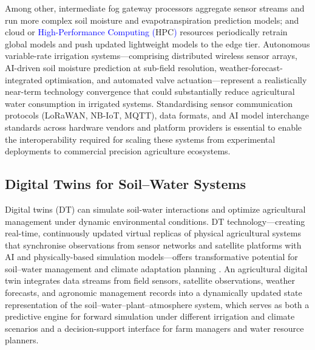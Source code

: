 \documentclass[land,article,submit,pdftex,moreauthors]{Definitions/mdpi}
\numberwithin{equation}{section}
\begin{document}
Among other, intermediate fog gateway processors aggregate sensor streams and run more complex soil moisture and evapotranspiration prediction models; and cloud or \textcolor{blue}{High-Performance Computing (}HPC\textcolor{blue}{)} resources periodically retrain global models and push updated lightweight models to the edge tier. Autonomous variable-rate irrigation systems---comprising distributed wireless sensor arrays, AI-driven soil moisture prediction at sub-field resolution, weather-forecast-integrated optimisation, and automated valve actuation---represent a realistically near-term technology convergence that could substantially reduce agricultural water consumption in irrigated systems. Standardising sensor communication protocols (LoRaWAN, NB-IoT, MQTT), data formats, and AI model interchange standards across hardware vendors and platform providers is essential to enable the interoperability required for scaling these systems from experimental deployments to commercial precision agriculture ecosystems.

\subsection{Digital Twins for Soil--Water Systems}

Digital twins (DT) can simulate soil-water interactions and optimize agricultural management under dynamic environmental conditions. DT technology---creating real-time, continuously updated virtual replicas of physical agricultural systems that synchronise observations from sensor networks and satellite 
platforms with AI and physically-based simulation models---offers transformative 
potential for soil--water management and climate adaptation planning 
\citep{pylianidis2021digital, verdouw2021digital}. An agricultural digital twin integrates data streams from field sensors, satellite observations, weather forecasts, and agronomic management records into a dynamically updated state representation of the soil--water--plant--atmosphere system, which serves as both a predictive engine for forward simulation under different irrigation and climate scenarios and a decision-support interface for farm managers and water resource planners. 
\end{document}
